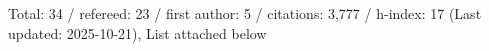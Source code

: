 Total: 34 / refereed: 23 / first author: 5 / citations: 3,777 / h-index: 17 (Last updated: 2025-10-21), List attached below